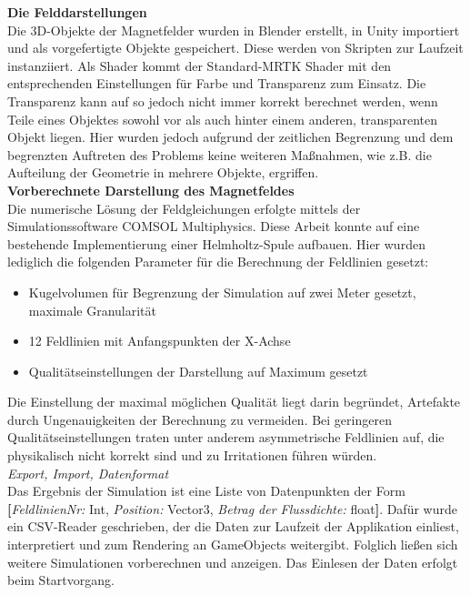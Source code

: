 \textbf{Die Felddarstellungen}\\
Die 3D-Objekte der Magnetfelder wurden in Blender erstellt, in Unity importiert und als vorgefertigte Objekte gespeichert. Diese werden von Skripten zur Laufzeit instanziiert. Als Shader kommt der Standard-MRTK Shader mit den entsprechenden Einstellungen für Farbe und Transparenz zum Einsatz. Die Transparenz kann auf so jedoch nicht immer korrekt berechnet werden, wenn Teile eines Objektes sowohl vor als auch hinter einem anderen, transparenten Objekt liegen. Hier wurden jedoch aufgrund der zeitlichen Begrenzung und dem begrenzten Auftreten des Problems keine weiteren Maßnahmen, wie z.B. die Aufteilung der Geometrie in mehrere Objekte, ergriffen.\\

\textbf{Vorberechnete Darstellung des Magnetfeldes}\\
Die numerische Lösung der Feldgleichungen erfolgte mittels der Simulationssoftware COMSOL Multiphysics. Diese Arbeit konnte auf eine bestehende Implementierung einer Helmholtz-Spule aufbauen. Hier wurden lediglich die folgenden Parameter für die Berechnung der Feldlinien gesetzt:
\begin{itemize}
	\setlength{\itemsep}{-1pt}
	\singlespacing
	\item Kugelvolumen für Begrenzung der Simulation auf zwei Meter gesetzt, maximale Granularität
	\item 12 Feldlinien mit Anfangspunkten der X-Achse
	\item Qualitätseinstellungen der Darstellung auf Maximum gesetzt
\end{itemize}

Die Einstellung der maximal möglichen Qualität liegt darin begründet, Artefakte durch Ungenauigkeiten der Berechnung zu vermeiden. Bei geringeren Qualitätseinstellungen traten unter anderem asymmetrische Feldlinien auf, die physikalisch nicht korrekt sind und zu Irritationen führen würden.\\

\textit{Export, Import, Datenformat}\\
Das Ergebnis der Simulation ist eine Liste von Datenpunkten der Form \textbf{[}\textit{FeldlinienNr:} Int, \textit{Position:} Vector3, \textit{Betrag der Flussdichte:} float\textbf{]}. Dafür wurde ein CSV-Reader geschrieben, der die Daten zur Laufzeit der Applikation einliest, interpretiert und zum Rendering an GameObjects weitergibt. Folglich ließen sich weitere Simulationen vorberechnen und anzeigen. Das Einlesen der Daten erfolgt beim Startvorgang.\\

